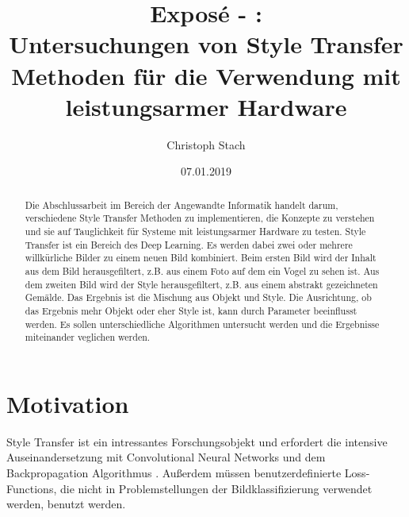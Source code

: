 


\title{\bf Exposé - \@exposeType:\protect\\ Untersuchungen von Style Transfer Methoden für die Verwendung mit leistungsarmer Hardware}
\author{Christoph Stach}
\date{07.01.2019}



\maketitle

\begin{otherlanguage}{ngerman}
	\begin{abstract}
		Die Abschlussarbeit im Bereich der Angewandte Informatik handelt darum, verschiedene Style Transfer Methoden zu implementieren,
		die Konzepte zu verstehen und sie auf Tauglichkeit für Systeme mit leistungsarmer Hardware zu testen. Style Transfer ist ein Bereich des 
		Deep Learning. Es werden dabei zwei oder mehrere willkürliche Bilder zu einem neuen Bild kombiniert. Beim ersten Bild wird der Inhalt aus
		dem Bild herausgefiltert, z.B. aus einem Foto auf dem ein Vogel zu sehen ist. Aus dem zweiten Bild wird der Style herausgefiltert, 
		z.B. aus einem abstrakt gezeichneten Gemälde. Das Ergebnis ist die Mischung aus Objekt und Style. Die Ausrichtung, ob das Ergebnis mehr 
		Objekt oder eher Style ist, kann durch Parameter beeinflusst werden. Es sollen unterschiedliche Algorithmen untersucht werden und
		die Ergebnisse miteinander veglichen werden.
	\end{abstract}
\end{otherlanguage}

\pagebreak

\section{Motivation}
Style Transfer ist ein intressantes Forschungsobjekt und erfordert die intensive Auseinandersetzung mit Convolutional Neural Networks
\cite{lecun-gradientbased-learning-applied-1998} und dem Backpropagation Algorithmus \cite{doi:10.1162/neco.1989.1.4.541}. Außerdem 
müssen benutzerdefinierte Loss-Functions, die nicht in Problemstellungen der Bildklassifizierung verwendet werden, benutzt werden.

